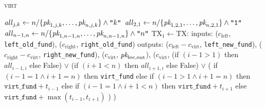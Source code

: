 \begin{center}
\begin{processbox}{\textsc{virt}}
\begin{algorithmic}[1]
          \State $\mathit{all}_{j, k} \gets n/\{\textit{pk}_{1, j, k}, \dots,
          \textit{pk}_{n, j, k}\} \wedge \texttt{"}k\texttt{"}$
        \EndFor
          \State $\mathit{all}_{2, 1} \gets n/\{\textit{pk}_{1, 2, 1}, \dots, \textit{pk}_{n, 2,
          1}\} \wedge \texttt{"1"}$
        \EndIf
          \State $\mathit{all}_{n-1, n} \gets n/\{\textit{pk}_{1, n-1, n}, \dots, \textit{pk}_{n,
          n-1, n}\} \wedge \texttt{"}n\texttt{"}$
        \EndIf
        \State {}
        \State {}
        \State $\mathrm{TX}_1 \gets \mathrm{TX}$:
        \Indent
          \State inputs:
          \Indent
            \State ($c_{\mathrm{left}}$, \texttt{left\_old\_fund}),
            \State ($c_{\mathrm{right}}$, \texttt{right\_old\_fund})
          \EndIndent
          \State outputs:
          \Indent
            \State ($c_{\mathrm{left}} - c_{\mathrm{virt}}$,
            \texttt{left\_new\_fund}),
            \State ($c_{\mathrm{right}} - c_{\mathrm{virt}}$,
            \texttt{right\_new\_fund}),
            \State ($c_{\mathrm{virt}}$, $\textit{pk}_{\mathrm{loc}, \mathrm{out}}$),
            \State ($c_{\mathrm{virt}}$,
            \Indent
              \State (if $(i-1 > 1)$ then $\mathit{all}_{i-1, i}$ else False)
              \State $\vee$ (if $(i+1 < n)$ then $\mathit{all}_{i+1, i}$ else
              False)
              \State $\vee$ (
              \Indent
                \State if $(i-1 = 1 \wedge i+1 = n)$ then \texttt{virt\_fund}
                \State else if $(i-1 > 1 \wedge i+1 = n)$ then
                $\texttt{virt\_fund} + t_{i-1}$
                \State else if $(i-1 = 1 \wedge i+1 < n)$ then
                $\texttt{virt\_fund} + t_{i+1}$
                \State else 
                $\texttt{virt\_fund} + \max{(t_{i-1}, t_{i+1})}$
              \EndIndent
              \State )
            \EndIndent
            \State )
          \EndIndent
        \EndIndent


\end{algorithmic}
\end{processbox}
\end{center}
